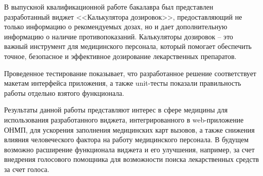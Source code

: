 \conclusion
В выпускной квалификационной работе бакалавра был представлен разработанный виджет <<Калькулятора дозировок>>, предоставляющий не только информацию о рекомендуемых дозах, но и дает дополнительную информацию о наличие противопоказаний. Калькуляторы дозировок -- это важный инструмент для медицинского персонала, который помогает обеспечить точное, безопасное и эффективное дозирование лекарственных препаратов.

Проведенное тестирование показывает, что разработанное решение соответствует макетам интерфейса приложения, а также unit-тесты показали правильность работы отдельно взятого функционала.

Результаты данной работы представляют интерес в сфере медицины для использования разработанного виджета, интегрированного в web-приложение ОНМП, для ускорения заполнения медицинских карт вызовов, а также снижения влияния человеческого фактора на работу медицинского персонала. В будущем возможно расширение функционала виджета и его улучшения, например, за счет внедрения голосового помощника для возможности поиска лекарственных средств за счет голоса.


